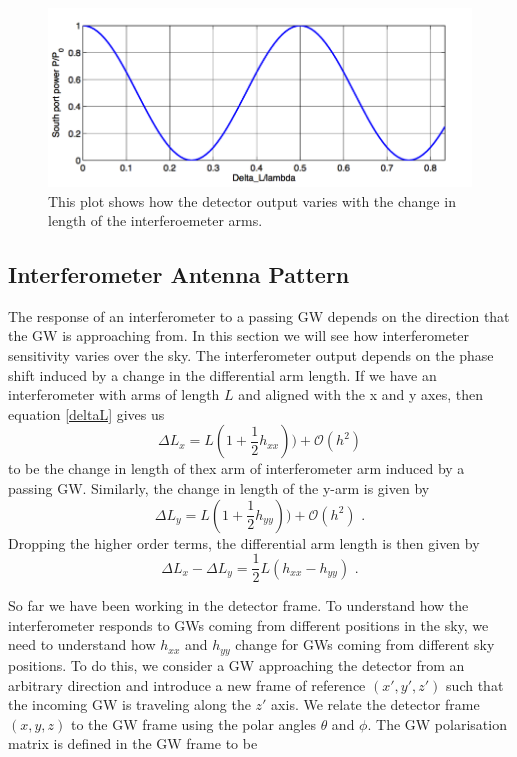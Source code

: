 \documentclass[11pt]{cuthesis}
\newcommand{\fs}{\text{ .}}
\begin{document}
\begin{figure}[ht]
\centering
\includegraphics[width=12cm]{detector_output} 
\caption{This plot shows how the detector output varies with the change in length of the interferoemeter arms. \cite{ifo_tech} }
\label{fig:power_output}
\end{figure}

\subsection{Interferometer Antenna Pattern} \label{sec:antenna pattern}
The response of an interferometer to a passing GW depends on the direction that the GW is approaching from. In this section we will see how interferometer sensitivity varies over the sky. The interferometer output depends on the phase shift induced by a change in the differential arm length. If we have an interferometer with arms of length $L$ and aligned with the x and y axes, then equation \ref{deltaL} gives us
\begin{equation}
\Delta L_x = L (1 + \frac{1}{2}h_{xx})) + \mathcal{O}(h^2)
\end{equation} 
to be the change in length of thex arm of interferometer arm induced by a passing GW. Similarly, the change in length of the y-arm is given by
\begin{equation}
\Delta L_y = L (1 + \frac{1}{2}h_{yy}))  + \mathcal{O}(h^2) \fs
\end{equation} 
Dropping the higher order terms, the differential arm length is then given by
\begin{equation} \label{darm eqn}
\Delta L_x - \Delta L_y = \frac{1}{2} L(h_{xx} - h_{yy}) \fs
\end{equation}

So far we have been working in the detector frame. To understand how the interferometer responds to GWs coming from different positions in the sky, we need to understand how $h_{xx}$ and $h_{yy}$ change for GWs coming from different sky positions. To do this, we consider a GW approaching the detector from an arbitrary direction and introduce a new frame of reference $(x',y',z')$ such that the incoming GW is traveling along the $z'$ axis. We relate the detector frame $(x,y,z)$ to the GW frame using the polar angles $\theta$ and $\phi$. The GW polarisation matrix is defined in the GW frame to be
\end{document}
